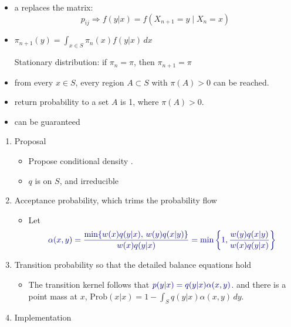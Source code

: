 \documentclass[8pt,a4paper,landscape]{extarticle}
\begin{document}
\begin{cscolumns}
\begin{itemize}
\item {} a  replaces the matrix:
\[ p_{ij}\Rightarrow f(y|x)=f(X_{n+1}=y\mid X_n=x) \]
\item {} $\pi_{n+1}(y)=\int_{x\in S}\pi_n(x)f(y|x)\,dx$

  Stationary distribution: if $\pi_n=\pi$, then $\pi_{n+1}=\pi$
\item {} from every $x\in S$, every region $A\subset S$ with $\pi(A)>0$ can be reached.
\item {} return probability to a set $A$ is 1, where $\pi(A)>0$.
\item {} can be guaranteed
\end{itemize}

\begin{definition}
\begin{enumerate}
\item Proposal
\begin{itemize}
\item Propose conditional density .
\item $q$ is on $S$, and irreducible
\end{itemize}
\item Acceptance probability, which trims the probability flow
\begin{itemize}
\item Let
\[ {\color{csBlue}\alpha(x,y)=\dfrac{\min\{w(x)q(y|x),\, w(y)q(x|y)\}}{w(x)q(y|x)}=\min\left\{1,\dfrac{w(y)q(x|y)}{w(x)q(y|x)}\right\}} \]
\end{itemize}
\item Transition probability so that the detailed balance equations hold
\begin{itemize}
\item The transition kernel follows that ${\color{csBlue}p(y|x)=q(y|x)\alpha(x,y)}$. and there is a point mass at $x$, $\mathrm{Prob}(x|x)=1-\int_S q(y|x)\alpha(x,y)\,dy$.
\end{itemize}
\item Implementation
\end{enumerate}
\end{definition}


\end{cscolumns}
\end{document}
